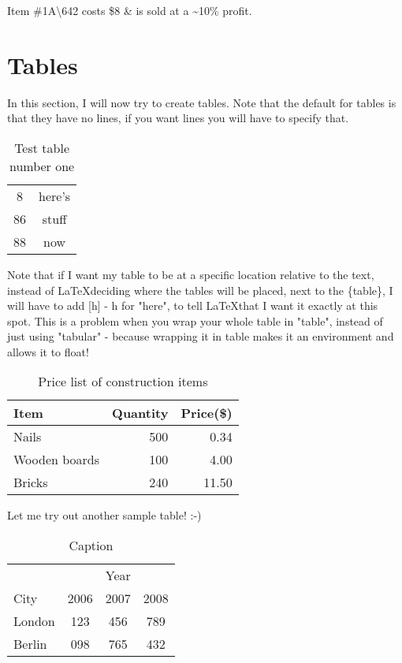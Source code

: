 \documentclass[a4paper, 12pt]{article}
\begin{document}
Item \#1A\textbackslash642 costs \$8 \& is sold at a \~{}10\% profit.

\newpage

\section{Tables}

In this section, I will now try to create tables. Note that the default for tables is that they have no lines, if you want lines you will have to specify that. 

\begin{table}[h]
    \centering
    \begin{tabular}{|c|c|}
        \hline
        8 & here's \\
        \cline{2-2}
        86 & stuff \\
        \hline
         \hline
         88 & now \\
         \hline
    \end{tabular}
    \caption{Test table number one}
\end{table}

Note that if I want my table to be at a specific location relative to the text, instead of \LaTeX deciding where the tables will be placed, next to the \{table\}, I will have to add [h] - h for "here", to tell \LaTeX that I want it exactly at this spot. This is a problem when you wrap your whole table in "table", instead of just using "tabular" - because wrapping it in table makes it an environment and allows it to float! 

\vspace{12pt}

\begin{table}[h]
    \centering
    \begin{tabular}{l|r|r}
        Item & Quantity & Price(\$) \\
        \hline
        Nails & 500 & 0.34 \\
        Wooden boards & 100 & 4.00 \\
        Bricks & 240 & 11.50
    \end{tabular}
    \caption{Price list of construction items}
\end{table}

Let me try out another sample table! :-) 

\begin{table}[h]
    \centering
    \begin{tabular}{l|ccc}
        & & Year \\
        \cline{2-4}
        City & 2006 & 2007 & 2008 \\
        \hline
        London & 123 & 456 & 789 \\
        Berlin & 098 & 765 & 432
    \end{tabular}
    \caption{Caption}
    \label{tab:my_label}
\end{table}
\end{document}
